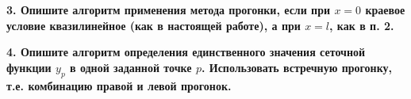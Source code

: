 \documentclass[a4paper,oneside,12pt]{extreport}
\begin{document}
\begin{figure}[ht!]
\end{figure}


\textbf{3. Опишите алгоритм применения метода прогонки, если при $x = 0$ краевое условие квазилинейное (как в настоящей работе), а при $x = l$, как в п. 2.}\\

\begin{figure}[ht!]
\end{figure}

\textbf{4. Опишите алгоритм определения единственного значения сеточной функции $y_p$ в одной заданной точке $p$. Использовать встречную прогонку, т.е. комбинацию правой и левой прогонок.}\\

\begin{figure}[ht!]
\end{figure}
\end{document}
